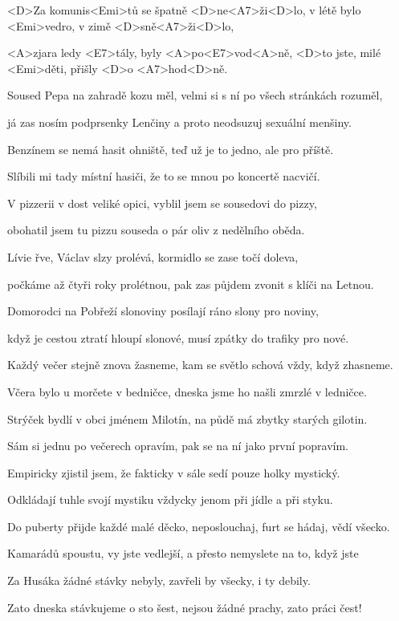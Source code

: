 

%

\zs
<D>Za komunis<Emi>tů se špatně <D>ne<A7>ži<D>lo,
v létě bylo <Emi>vedro, v zimě <D>sně<A7>ži<D>lo,

<A>zjara ledy <E7>tály, byly <A>po<E7>vod<A>ně,
<D>to jste, milé <Emi>děti, přišly <D>o <A7>hod<D>ně.
\ks

\zs
Soused Pepa na zahradě kozu měl,
velmi si s ní po všech stránkách rozuměl,

já zas nosím podprsenky Lenčiny
a proto neodsuzuj sexuální menšiny.
\ks

\zs
Benzínem se nemá hasit ohniště,
teď už je to jedno, ale pro příště.

Slíbili mi tady místní hasiči,
že to se mnou po koncertě nacvičí.
\ks

\zs
V pizzerii v dost veliké opici,
vyblil jsem se sousedovi do pizzy,

obohatil jsem tu pizzu souseda
o pár oliv z nedělního oběda.
\ks

\zs
Lívie řve, Václav slzy prolévá,
kormidlo se zase točí doleva,

počkáme až čtyři roky prolétnou,
pak zas půjdem zvonit s klíči na Letnou.
\ks

\zs
Domorodci na Pobřeží slonoviny
posílají ráno slony pro noviny,

když je cestou ztratí hloupí slonové,
musí zpátky do trafiky pro nové.
\ks

\zs
Každý večer stejně znova žasneme,
kam se světlo schová vždy, když zhasneme.

Včera bylo u morčete v bedničce,
dneska jsme ho našli zmrzlé v ledničce.
\ks

\zs
Strýček bydlí v obci jménem Milotín,
na půdě má zbytky starých gilotin.

Sám si jednu po večerech opravím,
pak se na ní jako první popravím.
\ks

\zs
Empiricky zjistil jsem, že fakticky
v sále sedí pouze holky mystický.

Odkládají tuhle svojí mystiku
vždycky jenom při jídle a při styku.
\ks

\zs
Do puberty přijde každé malé děcko,
neposlouchaj, furt se hádaj, vědí všecko.

Kamarádů spoustu, vy jste vedlejší,
a přesto nemyslete na to, když jste 
\ks

\zs
Za Husáka žádné stávky nebyly,
zavřeli by všecky, i ty debily.

Zato dneska stávkujeme o sto šest,
nejsou žádné prachy, zato práci čest!
\ks
\kp
